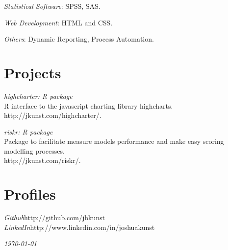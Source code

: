 \documentclass[margin]{res}
\begin{document}
\begin{resume}
    {\sl Statistical Software}: SPSS, SAS.
    
    {\sl Web Development}: HTML and CSS.
    
    {\sl Others}: Dynamic Reporting, Process Automation.

\vspace{1cm}

\newpage

\section{Projects}


    {\sl highcharter: R package}\\
    R interface to the javascript charting library highcharts.\\
    http://jkunst.com/highcharter/.
    
    {\sl riskr: R package}\\
    Package to facilitate measure models performance and make easy scoring modelling processes.\\
    http://jkunst.com/riskr/.
    

\vspace{1cm}

\section{Profiles}
    
    {\sl Github}\hfill http://github.com/jbkunst\\
    
    {\sl LinkedIn}\hfill http://www.linkedin.com/in/joshuakunst

\vspace{1cm}


\end{resume}

\vspace{0.5cm}

\hfill {\sl \today}
\end{document}
